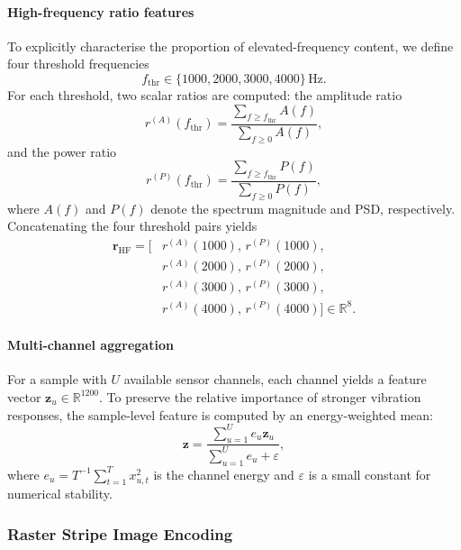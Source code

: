 \documentclass[preprint,12pt,3p]{elsarticle}
\newcommand{\R}{\mathbb{R}}
\begin{document}
\paragraph{High-frequency ratio features}
To explicitly characterise the proportion of elevated-frequency
content, we define four threshold frequencies
\[
f_\mathrm{thr} \in \{1000, 2000, 3000, 4000\}\,\text{Hz}.
\]
For each threshold, two scalar ratios are computed: the amplitude
ratio
\begin{equation}
  r^{(A)}(f_\mathrm{thr})
  =
  \frac{\sum_{f \ge f_\mathrm{thr}} A(f)}
       {\sum_{f \ge 0} A(f)},
\end{equation}
and the power ratio
\begin{equation}
  r^{(P)}(f_\mathrm{thr})
  =
  \frac{\sum_{f \ge f_\mathrm{thr}} P(f)}
       {\sum_{f \ge 0} P(f)},
\end{equation}
where $A(f)$ and $P(f)$ denote the spectrum magnitude and PSD,
respectively. Concatenating the four threshold pairs yields
\begin{equation}
\begin{aligned}
\mathbf{r}_{\mathrm{HF}}
=
\bigl[
&r^{(A)}(1000),\,r^{(P)}(1000),\\
&r^{(A)}(2000),\,r^{(P)}(2000),\\
&r^{(A)}(3000),\,r^{(P)}(3000),\\
&r^{(A)}(4000),\,r^{(P)}(4000)
\bigr]
\in \R^{8}.
\end{aligned}
\end{equation}

\paragraph{Multi-channel aggregation}
For a sample with $U$ available sensor channels, each channel yields a
feature vector $\mathbf{z}_u \in \R^{1200}$. To preserve the relative
importance of stronger vibration responses, the sample-level feature is
computed by an energy-weighted mean:
\begin{equation}
\mathbf{z}
=
\frac{\sum_{u=1}^{U} e_u \mathbf{z}_u}
     {\sum_{u=1}^{U} e_u + \varepsilon},
\label{eq:aggregation}
\end{equation}
where $e_u = T^{-1}\sum_{t=1}^{T} x_{u,t}^2$ is the channel energy and
$\varepsilon$ is a small constant for numerical stability.
\subsubsection{Raster Stripe Image Encoding}
\label{sec:raster}
\end{document}

